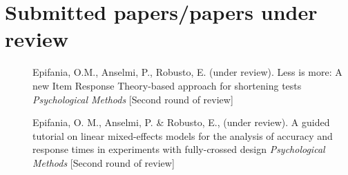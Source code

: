 \documentclass[letterpaper,12pt]{article}
\begin{document}
\section{Submitted papers/papers under review}
\begin{description}
	
	\item[] Epifania, O.M., Anselmi, P., Robusto, E. (under review). Less is more: A new Item Response Theory-based approach for shortening tests \emph{Psychological Methods} [Second round of review]
	\item[] Epifania, O. M., Anselmi, P. \& Robusto, E., (under review).	A guided tutorial on linear mixed-effects models for the analysis of accuracy and response times in experiments with fully-crossed design \emph{Psychological Methods} [Second round of review]
	
\end{description}
	
\end{document}
